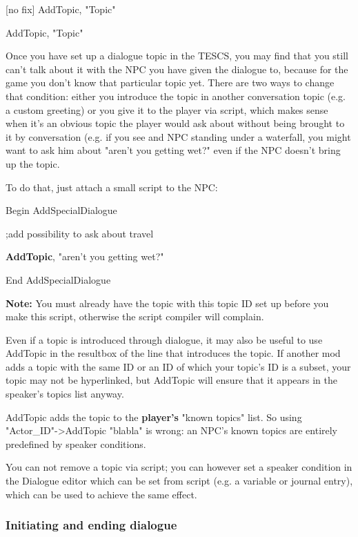 \documentclass[
]{article}
\begin{document}
{[}no fix{]} AddTopic, "Topic"

AddTopic, "Topic"

Once you have set up a dialogue topic in the TESCS, you may find that
you still can't talk about it with the NPC you have given the dialogue
to, because for the game you don't know that particular topic yet. There
are two ways to change that condition: either you introduce the topic in
another conversation topic (e.g. a custom greeting) or you give it to
the player via script, which makes sense when it's an obvious topic the
player would ask about without being brought to it by conversation (e.g.
if you see and NPC standing under a waterfall, you might want to ask him
about "aren't you getting wet?" even if the NPC doesn't bring up the
topic.

To do that, just attach a small script to the NPC:

Begin AddSpecialDialogue

;add possibility to ask about travel

\textbf{AddTopic}, "aren't you getting wet?"

End AddSpecialDialogue

\textbf{Note:} You must already have the topic with this topic ID set up
before you make this script, otherwise the script compiler will
complain.

Even if a topic is introduced through dialogue, it may also be useful to
use AddTopic in the resultbox of the line that introduces the topic. If
another mod adds a topic with the same ID or an ID of which your topic's
ID is a subset, your topic may not be hyperlinked, but AddTopic will
ensure that it appears in the speaker's topics list anyway.

AddTopic adds the topic to the \textbf{player's} "known topics" list. So
using\\
"Actor\_ID"-\textgreater AddTopic "blabla" is wrong: an NPC's known
topics are entirely predefined by speaker conditions.

You can not remove a topic via script; you can however set a speaker
condition in the Dialogue editor which can be set from script (e.g. a
variable or journal entry), which can be used to achieve the same
effect.

\hypertarget{initiating-and-ending-dialogue}{%
\subsubsection{Initiating and ending
dialogue}\label{initiating-and-ending-dialogue}}
\end{document}
